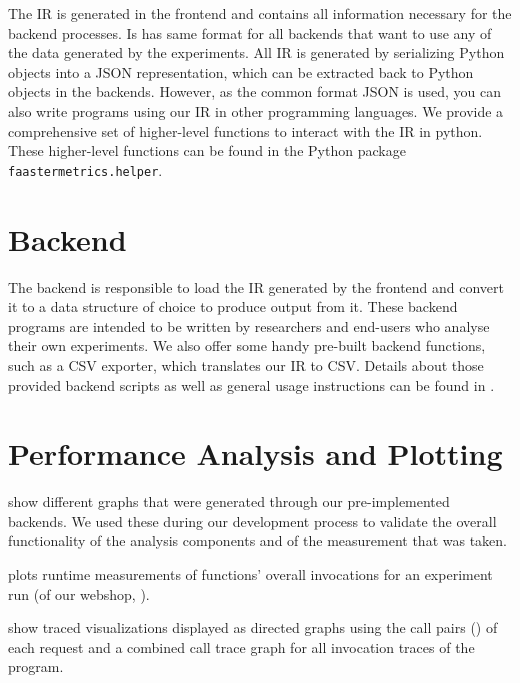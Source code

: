 \documentclass[../main.tex]{subfiles}
\begin{document}
The IR is generated in the frontend and contains all information necessary for the backend processes.
Is has same format for all backends that want to use any of the data generated by the experiments. 
All IR is generated by serializing Python objects into a JSON representation, 
which can be extracted back to Python objects in the backends. 
However, as the common format JSON is used, you can also write programs using our IR in other programming languages.
We provide a comprehensive set of higher-level functions to interact with the IR in python.
These higher-level functions can be found in the Python package \texttt{faastermetrics.helper}.

\section{Backend}%
\label{sec:analysisBackend}

The backend is responsible to load the IR generated by the frontend and convert it to a data structure of choice to produce output from it. 
These backend programs are intended to be written by researchers and end-users who analyse their own experiments. 
We also offer some handy pre-built backend functions, such as a CSV exporter, which translates our IR to CSV.\@
Details about those provided backend scripts as well as general usage instructions can be found in .

\section{Performance Analysis and Plotting}%
\label{sec:analysisPlots}

 show different graphs that were generated through our pre-implemented backends. 
We used these during our development process to validate the overall functionality of the analysis components and 
of the measurement that was taken. 

 plots runtime measurements of functions' overall invocations 
for an experiment run (of our webshop, ). 

 show traced visualizations displayed as directed graphs
using the call pairs () of each request and 
a combined call trace graph for all invocation traces of the program. 
\end{document}
